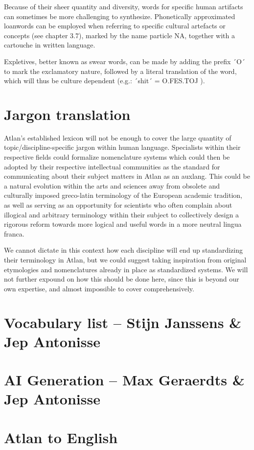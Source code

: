 \noindent Because of their sheer quantity and diversity, words for specific human artifacts can sometimes be more challenging to synthesize. Phonetically approximated loanwords can be employed when referring to specific cultural artefacts or concepts (see chapter 3.7), marked by the name particle NA, together with a cartouche in written language. 

Expletives, better known as swear words, can be made by adding the prefix ´O´ \Atlano to mark the exclamatory nature, followed by a literal translation of the word, which will thus be culture dependent (e.g.: ´shit´ = O.FES.TOJ \Atlano \fes \toj). 

\section{Jargon translation}


Atlan’s established lexicon will not be enough to cover the large quantity of topic/discipline-specific jargon within human language. Specialists within their respective fields could formalize nomenclature systems which could then be adopted by their respective intellectual communities as the standard for communicating about their subject matters in Atlan as an auxlang. This could be a natural evolution within the arts and sciences away from obsolete and culturally imposed greco-latin terminology of the European academic tradition, as well as serving as an opportunity for scientists who often complain about illogical and arbitrary terminology within their subject to collectively design a rigorous reform towards more logical and useful words in a more neutral lingua franca.  

We cannot dictate in this context how each discipline will end up standardizing their terminology in Atlan, but we could suggest taking inspiration from original etymologies and nomenclatures already in place as standardized systems. We will not further expound on how this should be done here, since this is beyond our own expertise, and almost impossible to cover comprehensively.







\section{Vocabulary list -- {\small Stijn Janssens \& Jep Antonisse}}

\section{AI Generation -- {\small Max Geraerdts \& Jep Antonisse}}

\section{Atlan to English}




